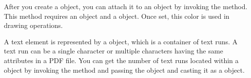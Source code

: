 \documentclass[letterpaper,12pt,english,openany,oneside]{sphinxmanual}
\begin{document}
\begin{sphinxVerbatim}[commandchars=\\\{\}]
     
 
   
 \PYG{p}{[}\PYG{p}{]}  
 \PYG{p}{[}\PYG{p}{]}  
 \PYG{p}{[}\PYG{p}{]}  
\end{sphinxVerbatim}

After you create a  object, you can attach it to an  object by invoking the  method. This method requires an  object and a  object. Once set, this color is used in drawing operations.

A text element is represented by a  object, which is a container of text runs. A text run can be a single character or multiple characters having the same attributes in a PDF file. You can get the number of text runs located within a  object by invoking the  method and passing the  object and casting it as a  object.

\begin{sphinxVerbatim}[commandchars=\\\{\}]
    
\end{sphinxVerbatim}
\end{document}
